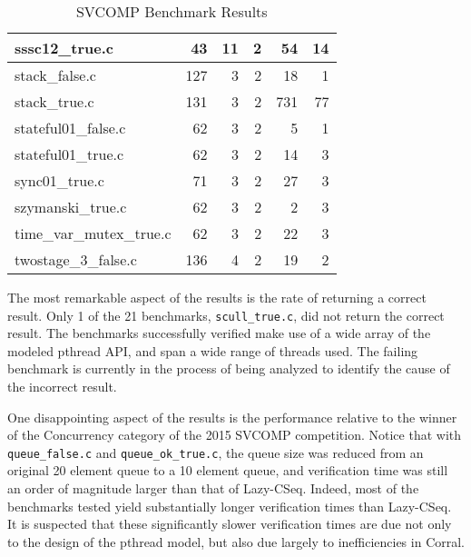 \begin{table}[ht]
\begin{tabular}{|l|r|r|r|r|r|}
\hline
sssc12\_true.c             & 43  & 11      & 2            & 54            & 14           \\
\hline
stack\_false.c             & 127 & 3       & 2            & 18            & 1            \\
\hline
stack\_true.c              & 131 & 3       & 2            & 731           & 77           \\
\hline
stateful01\_false.c        & 62  & 3       & 2            & 5             & 1            \\
\hline
stateful01\_true.c         & 62  & 3       & 2            & 14            & 3            \\
\hline
sync01\_true.c             & 71  & 3       & 2            & 27            & 3            \\
\hline
szymanski\_true.c          & 62  & 3       & 2            & 2             & 3            \\
\hline
time\_var\_mutex\_true.c   & 62  & 3       & 2            & 22            & 3            \\
\hline
twostage\_3\_false.c       & 136 & 4       & 2            & 19            & 2            \\
\hline
\end{tabular}
\caption{SVCOMP Benchmark Results}\label{table:benchmarkresults}
\end{table}

The most remarkable aspect of the results is the rate of returning a
correct result. Only 1 of the 21 benchmarks,
\lstinline[identifierstyle=\color{black}]|scull_true.c|, did not
return the correct result.  The benchmarks successfully verified make
use of a wide array of the modeled pthread API, and span a wide range
of threads used.   The failing benchmark is currently in the process
of being analyzed to identify the cause of the incorrect result.

One disappointing aspect of the results is the performance relative to
the winner of the Concurrency category of the 2015 SVCOMP
competition.  Notice that with
\lstinline[identifierstyle=\color{black}]|queue_false.c| and
\lstinline[identifierstyle=\color{black}]|queue_ok_true.c|, the queue
size was reduced from an original 20 element queue to a 10 element
queue, and verification time was still an order of magnitude larger
than that of Lazy-CSeq.  Indeed, most of the benchmarks tested yield
substantially longer verification times than Lazy-CSeq.  It is
suspected that these significantly slower verification times are due
not only to the design of the pthread model, but also due largely to
inefficiencies in Corral. 

